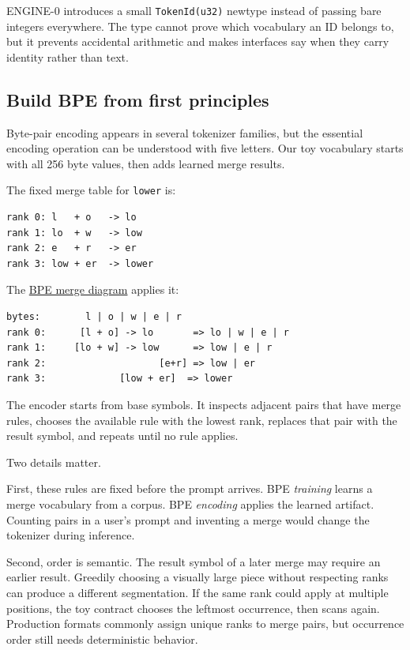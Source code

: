 \documentclass[
  10pt,
]{article}
\begin{document}
ENGINE-0 introduces a small \texttt{TokenId(u32)} newtype instead of
passing bare integers everywhere. The type cannot prove which vocabulary
an ID belongs to, but it prevents accidental arithmetic and makes
interfaces say when they carry identity rather than text.

\subsection{Build BPE from first
principles}\label{build-bpe-from-first-principles}

Byte-pair encoding appears in several tokenizer families, but the
essential encoding operation can be understood with five letters. Our
toy vocabulary starts with all 256 byte values, then adds learned merge
results.

The fixed merge table for \texttt{lower} is:

\begin{verbatim}
rank 0: l   + o   -> lo
rank 1: lo  + w   -> low
rank 2: e   + r   -> er
rank 3: low + er  -> lower
\end{verbatim}

The
\href{https://github.com/hermonai/inside-the-llm-engine/blob/astra-visual-rewrite/diagrams/tokenizer/bpe-merge-process.txt}{BPE
merge diagram} applies it:

\begin{verbatim}
bytes:        l | o | w | e | r
rank 0:      [l + o] -> lo       => lo | w | e | r
rank 1:     [lo + w] -> low      => low | e | r
rank 2:                    [e+r] => low | er
rank 3:             [low + er]  => lower
\end{verbatim}

The encoder starts from base symbols. It inspects adjacent pairs that
have merge rules, chooses the available rule with the lowest rank,
replaces that pair with the result symbol, and repeats until no rule
applies.

Two details matter.

First, these rules are fixed before the prompt arrives. BPE
\emph{training} learns a merge vocabulary from a corpus. BPE
\emph{encoding} applies the learned artifact. Counting pairs in a user's
prompt and inventing a merge would change the tokenizer during
inference.

Second, order is semantic. The result symbol of a later merge may
require an earlier result. Greedily choosing a visually large piece
without respecting ranks can produce a different segmentation. If the
same rank could apply at multiple positions, the toy contract chooses
the leftmost occurrence, then scans again. Production formats commonly
assign unique ranks to merge pairs, but occurrence order still needs
deterministic behavior.
\end{document}
